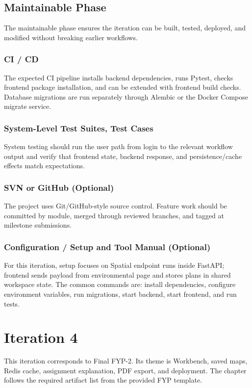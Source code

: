 \documentclass[12pt,a4paper,oneside]{report}
\begin{document}
\section{Maintainable Phase}
The maintainable phase ensures the iteration can be built, tested, deployed, and modified without breaking earlier workflows.

\subsection{CI / CD}
The expected CI pipeline installs backend dependencies, runs Pytest, checks frontend package installation, and can be extended with frontend build checks. Database migrations are run separately through Alembic or the Docker Compose migrate service.

\subsection{System-Level Test Suites, Test Cases}
System testing should run the user path from login to the relevant workflow output and verify that frontend state, backend response, and persistence/cache effects match expectations.

\subsection{SVN or GitHub (Optional)}
The project uses Git/GitHub-style source control. Feature work should be committed by module, merged through reviewed branches, and tagged at milestone submissions.

\subsection{Configuration / Setup and Tool Manual (Optional)}
For this iteration, setup focuses on Spatial endpoint runs inside FastAPI; frontend sends payload from environmental page and stores plans in shared workspace state. The common commands are: install dependencies, configure environment variables, run migrations, start backend, start frontend, and run tests.

\chapter{Iteration 4}
This iteration corresponds to Final FYP-2. Its theme is Workbench, saved maps, Redis cache, assignment explanation, PDF export, and deployment. The chapter follows the required artifact list from the provided FYP template.
\end{document}
